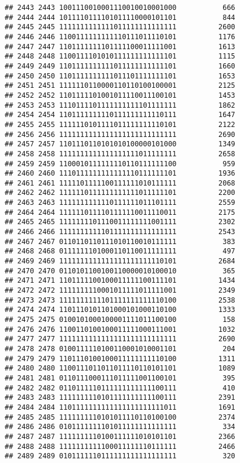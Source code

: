 \documentclass[]{article}
\begin{document}
\begin{verbatim}
## 2443 2443 1001110010001110010010001000           666
## 2444 2444 1011110111101011110000101101           844
## 2445 2445 1111111111111011111111111111          2600
## 2446 2446 1100111111111110111011110101          1176
## 2447 2447 1101111111101111100011111001          1613
## 2448 2448 1100111101010111111111111101          1115
## 2449 2449 1101111111111011111111111101          1660
## 2450 2450 1101111111111011101111111101          1653
## 2451 2451 1111110110000110110100100001          2125
## 2452 2452 1101111101001011110011100101          1453
## 2453 2453 1110111101111111111101111111          1862
## 2454 2454 1101111111110111111111110111          1647
## 2455 2455 1111110101111011111111110101          2122
## 2456 2456 1111111111111111111111111111          2690
## 2457 2457 1101110110101010100000101000          1349
## 2458 2458 1111111111111111111011111111          2658
## 2459 2459 1100010111111110110111111100           959
## 2460 2460 1110111111111111110111111101          1936
## 2461 2461 1111101111100111111010111111          2068
## 2462 2462 1111110111111111111011111101          2200
## 2463 2463 1111111111110111111011101111          2559
## 2464 2464 1111110111101111110011110011          2175
## 2465 2465 1111111101110011111111001111          2302
## 2466 2466 1111111111101111111111111111          2543
## 2467 2467 0110110110111010110010111111           383
## 2468 2468 0111111101000110110011111111           497
## 2469 2469 1111111111111111111111110101          2684
## 2470 2470 0110101100100110000010100010           365
## 2471 2471 1101111100100011111100111101          1434
## 2472 2472 1111111110001011111011111001          2349
## 2473 2473 1111111111101111111111110100          2538
## 2474 2474 1101110101101000101000110100          1333
## 2475 2475 0100101000100001111011100100           158
## 2476 2476 1100110100100011111000111001          1032
## 2477 2477 1111111111111111111111111111          2690
## 2478 2478 0100111110100110001010001101           204
## 2479 2479 1101110100100011111111110100          1311
## 2480 2480 1100111011011011110110101101          1089
## 2481 2481 0110111000111011111001100101           395
## 2482 2482 0110111110111111111111100111           410
## 2483 2483 1111111110101111111111100111          2391
## 2484 2484 1101111111111111111111111011          1691
## 2485 2485 1111111110101011110110100100          2374
## 2486 2486 0101111111101011111111111111           334
## 2487 2487 1111111110100111111010101101          2366
## 2488 2488 1111111111100011111110111111          2466
## 2489 2489 0101111110111111111111111111           320

\end{verbatim}
\end{document}
